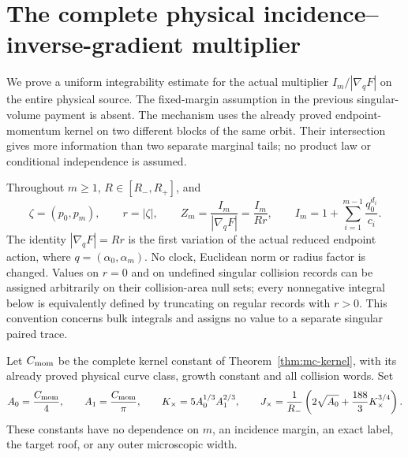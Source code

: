 \section{The complete physical incidence--inverse-gradient multiplier}
\label{sec:sm-singular-multiplier}
We prove a uniform integrability estimate for the actual multiplier
$I_m/|\nabla_qF|$ on the entire physical source.  The fixed-margin
assumption in the previous singular-volume payment is absent.
The mechanism uses the already proved endpoint-momentum kernel on
two different blocks of the same orbit.  Their intersection gives
more information than two separate marginal tails; no product law
or conditional independence is assumed.

Throughout $m\ge1$, $R\in[R_-,R_+]$, and
\[
 \zeta=(p_0,p_m),\qquad r=|\zeta|,\qquad
 Z_m=\frac{I_m}{|\nabla_qF|}=\frac{I_m}{Rr},\qquad
 I_m=1+\sum_{i=1}^{m-1}\frac{q_0^{d_i}}{c_i}.
\]
The identity $|\nabla_qF|=Rr$ is the first variation of the
actual reduced endpoint action, where $q=(\alpha_0,\alpha_m)$.
No clock, Euclidean norm or radius factor is changed.
Values on $r=0$ and on undefined singular collision records can
be assigned arbitrarily on their collision-area null sets; every
nonnegative integral below is equivalently defined by truncating
on regular records with $r>0$.  This convention concerns bulk
integrals and assigns no value to a separate singular paired trace.

Let $C_{\rm mom}$ be the complete kernel constant of
Theorem~\ref{thm:mc-kernel}, with its already proved physical curve
class, growth constant and all collision words.  Set
\begin{equation}\label{eq:sm-constants}
 A_0=\frac{C_{\rm mom}}4,\qquad
 A_1=\frac{C_{\rm mom}}\pi,\qquad
 K_\times=5A_0^{1/3}A_1^{2/3},\qquad
 J_\times=\frac1{R_-}
       \left(2\sqrt{A_0}+\frac{188}{3}K_\times^{3/4}\right).
\end{equation}
These constants have no dependence on $m$, an incidence margin,
an exact label, the target roof, or any outer microscopic width.

